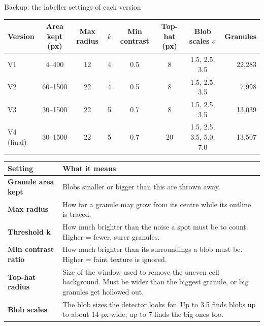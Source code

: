 \begin{frame}{Backup: the labeller settings of each version}
  \centering\scriptsize
  \renewcommand{\arraystretch}{1.05}\setlength{\tabcolsep}{3.5pt}
\begin{tabular}{@{}lccccccr@{}}
\toprule
\textbf{Version} & \textbf{Area kept (px)} & \textbf{Max radius} & \textbf{$k$} & \textbf{Min contrast} & \textbf{Top-hat (px)} & \textbf{Blob scales $\sigma$} & \textbf{Granules} \\
\midrule
V1 & 4--400 & 12 & 4 & 0.5 & 8 & 1.5, 2.5, 3.5 & 22,283 \\
V2 & 60--1500 & 22 & 4 & 0.5 & 8 & 1.5, 2.5, 3.5 & 7,998 \\
V3 & 30--1500 & 22 & 5 & 0.7 & 8 & 1.5, 2.5, 3.5 & 13,039 \\
V4 (final) & 30--1500 & 22 & 5 & 0.7 & 20 & 1.5, 2.5, 3.5, 5.0, 7.0 & 13,507 \\
\bottomrule
\end{tabular}

  \vspace{3mm}
\begin{tabular}{@{}lp{11.2cm}@{}}
\toprule
\textbf{Setting} & \textbf{What it means} \\
\midrule
\textbf{Granule area kept} & Blobs smaller or bigger than this are thrown away. \\
\textbf{Max radius} & How far a granule may grow from its centre while its outline is traced. \\
\textbf{Threshold k} & How much brighter than the noise a spot must be to count. Higher = fewer, surer granules. \\
\textbf{Min contrast ratio} & How much brighter than its surroundings a blob must be. Higher = faint texture is ignored. \\
\textbf{Top-hat radius} & Size of the window used to remove the uneven cell background. Must be wider than the biggest granule, or big granules get hollowed out. \\
\textbf{Blob scales} & The blob sizes the detector looks for. Up to 3.5 finds blobs up to about 14 px wide; up to 7 finds the big ones too. \\
\bottomrule
\end{tabular}
  \vfill
\end{frame}


